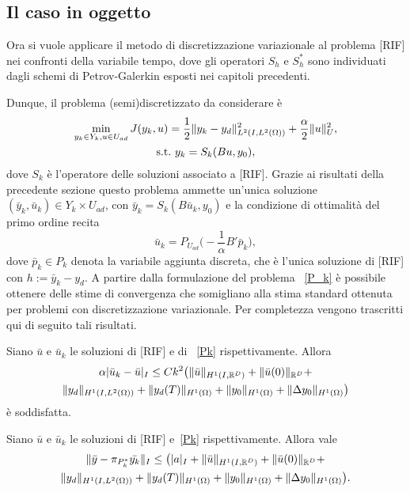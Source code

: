 \subsection{Il caso in oggetto}

Ora si vuole applicare il metodo di discretizzazione variazionale al problema [RIF] nei confronti della variabile tempo, dove gli operatori $ S_h $ e $ S^*_h $ sono individuati dagli schemi di Petrov-Galerkin esposti nei capitoli precedenti.

Dunque, il problema (semi)discretizzato da considerare è
\begin{gather}
\label{Pk}
\min_{y_k\in Y_k, u\in U_{ad}} J(y_k,u)=\frac{1}{2}\lVert y_k-y_d\rVert^2_{L^2(I,L^2(\Omega))} + \frac{\alpha}{2}\lVert u\rVert^2_U, \\
\text{s.t.} \ y_k=S_k(Bu,y_0),
\end{gather}
dove $ S_k $ è l'operatore delle soluzioni associato a [RIF]. Grazie ai risultati della precedente sezione questo problema ammette un'unica soluzione $ (\bar{y}_k, \bar{u}_k)\in Y_k\times U_{ad} $, con $ \bar{y}_k=S_k(B\bar{u}_k,y_0) $ e la condizione di ottimalità del primo ordine recita
\begin{equation}
\label{cnott}
\bar{u}_k=P_{U_{ad}}\big( -\frac{1}{\alpha}B'\bar{p}_k\big),
\end{equation}
dove $ \bar{p}_k\in P_k $ denota la variabile aggiunta discreta, che è l'unica soluzione di [RIF] con $ h:=\bar{y}_k-y_d $.
A partire dalla formulazione del problema ~\eqref{P_k} è possibile ottenere delle stime di convergenza che somigliano alla stima standard ottenuta per problemi con discretizzazione variazionale. Per completezza vengono trascritti qui di seguito tali risultati.
\begin{teorema}
\label{convu}

Siano $ \bar{u} $ e $ \bar{u}_k $ le soluzioni di [RIF]  e di ~\eqref{Pk} rispettivamente. Allora
\begin{multline} 
\alpha \lvert \bar{u}_k-\bar{u}\rvert_I\le Ck^2\big( \lVert\bar{u}\rVert_{H^1(I,\mathbb{R}^D)} + \lVert\bar{u}(0)\rVert_{\mathbb{R}^D} + \\
\lVert y_d\rVert_{H^1(I,L^2(\Omega))} + \lVert y_d(T)\rVert_{H^1(\Omega)} + \lVert y_0\rVert_{H^1(\Omega)} + \lVert\Delta y_0\rVert_{H^1(\Omega)}\big)
\end{multline}
è soddisfatta.

\end{teorema}

\begin{teorema}
\label{convy}

Siano $ \bar{u} $ e $ \bar{u}_k $ le soluzioni di [RIF] e~\eqref{Pk} rispettivamente. Allora vale
\begin{multline}
\lVert\bar{y}-\pi_{P^*_k}\bar{y_k}\rVert_I\le\big( \lvert a\rvert_I + \lVert\bar{u}\rVert_{H^1(I,\mathbb{R}^D)} + \lVert\bar{u}(0)\rVert_{\mathbb{R}^D} + \\ 
\lVert y_d\rVert_{H^1(I,L^2(\Omega))} + \lVert y_d(T)\rVert_{H^1(\Omega)} + \lVert y_0\rVert_{H^1(\Omega)} + \lVert\Delta y_0\rVert_{H^1(\Omega)}\big).
\end{multline}

\end{teorema}  